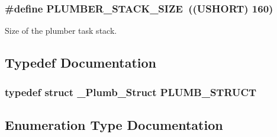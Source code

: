 \subsubsection[{PLUMBER\_\-STACK\_\-SIZE}]{\setlength{\rightskip}{0pt plus 5cm}\#define PLUMBER\_\-STACK\_\-SIZE~((USHORT) 160)}\label{plumber_8h_a1405128e0e768330b79262928c240c13}


Size of the plumber task stack. 

\subsection{Typedef Documentation}
\subsubsection[{PLUMB\_\-STRUCT}]{\setlength{\rightskip}{0pt plus 5cm}typedef struct {\bf \_\-Plumb\_\-Struct}  {\bf PLUMB\_\-STRUCT}}\label{plumber_8h_a57144c913cebcc50c706977339669efc}


\subsection{Enumeration Type Documentation}
